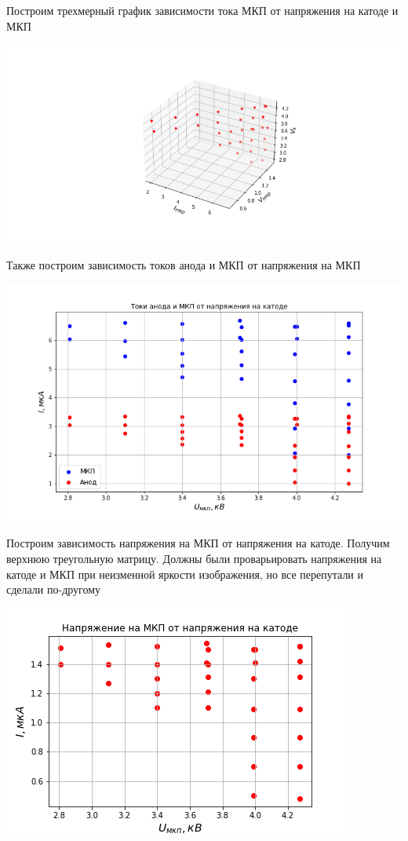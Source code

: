 \documentclass[a4paper,12pt]{article}
\theoremstyle{plain} %
\theoremstyle{definition} %
\theoremstyle{remark} %
\begin{document}
Построим трехмерный график зависимости тока МКП от напряжения на катоде и МКП

\begin{center}
    \includegraphics[scale = 0.55]{V_mkp_k_I_mkp.png}
\end{center}


\break

Также построим зависимость токов анода и МКП от напряжения на МКП

\begin{center}
    \includegraphics[scale = 0.5]{I_V_K_1.png}
\end{center}

Построим зависимость напряжения на МКП от напряжения на катоде. Получим верхнюю треугольную матрицу. Должны были проварьировать напряжения на катоде и МКП при неизменной яркости изображения, но все перепутали и сделали по-другому

\includegraphics[scale = 0.9]{Triangle.png}
\end{document}
